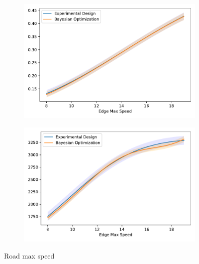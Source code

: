 \begin{figure}[h!]
\centering
\begin{subfigure}{0.5\textwidth}
  \centering
  \includegraphics[width=\textwidth]{images/ofat_compare/time/edge_max_speed.pdf}
\end{subfigure}%
\begin{subfigure}{0.5\textwidth}
  \centering
  \includegraphics[width=\textwidth]{images/ofat_compare/co2/edge_max_speed.pdf}
\end{subfigure}
\caption{Road max speed}
\end{figure}


